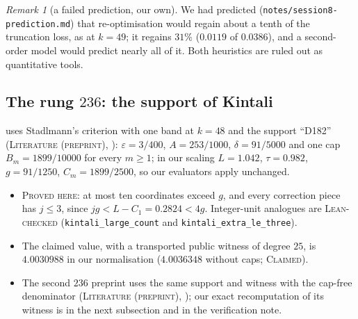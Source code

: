 \documentclass[11pt]{amsart}
\theoremstyle{definition}
\theoremstyle{remark}
\newtheorem{remark}[theorem]{Remark}
\newcommand{\lbl}[1]{\textup{\textsc{#1}}}
\begin{document}
\begin{remark}[a failed prediction, our own]\label{rem:prediction}
We had predicted (\texttt{notes/}\allowbreak\texttt{session8-prediction.md}) that
re-optimisation would regain about a tenth of the truncation loss, as at
$k=49$; it regains $31\%$ ($0.0119$ of $0.0386$), and a second-order model
would predict nearly all of it. Both heuristics are ruled out as
quantitative tools.
\end{remark}

\subsection*{The rung \texorpdfstring{$236$}{236}: the support of Kintali}
\cite{Kin26} uses Stadlmann's criterion with one band at $k=48$ and the
support ``D182'' (\lbl{Literature (preprint)}, \cite[\S2]{Kin26}):
$\varepsilon=3/400$, $A=253/1000$, $\delta=91/5000$ and one cap
$B_m=1899/10000$ for every $m\ge1$; in our scaling $L=1.042$, $\tau=0.982$,
$g=91/1250$, $C_m=1899/2500$, so our evaluators apply unchanged.
\begin{itemize}
\item \lbl{Proved here}: at most ten coordinates exceed $g$, and every
correction piece has $j\le3$, since $jg<L-C_1=0.2824<4g$. Integer-unit
analogues are \lbl{Lean-checked} (\texttt{kintali\_large\_count} and
\texttt{kintali\_extra\_le\_three}).
\item The claimed value, with a transported public witness of degree $25$, is
$4.0030988$ in our normalisation ($4.0036348$ without caps; \lbl{Claimed}).
\item The second $236$ preprint \cite{SY26} uses the same support and witness
with the cap-free denominator (\lbl{Literature (preprint)}, \cite[\S4]{SY26});
our exact recomputation of its witness is in the next subsection and in the
verification note.
\end{itemize}
\end{document}
